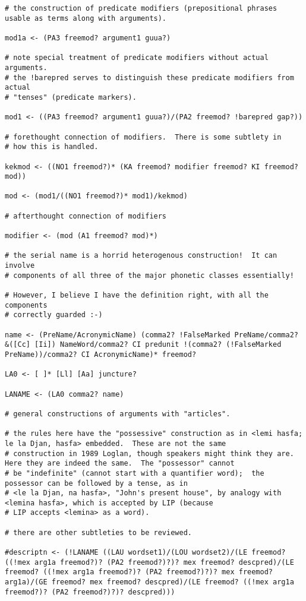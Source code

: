 \documentclass{article}
\begin{document}
\begin{verbatim}
# the construction of predicate modifiers (prepositional phrases usable as terms along with arguments).

mod1a <- (PA3 freemod? argument1 guua?)

# note special treatment of predicate modifiers without actual arguments.
# the !barepred serves to distinguish these predicate modifiers from actual
# "tenses" (predicate markers).

mod1 <- ((PA3 freemod? argument1 guua?)/(PA2 freemod? !barepred gap?))

# forethought connection of modifiers.  There is some subtlety in
# how this is handled.

kekmod <- ((NO1 freemod?)* (KA freemod? modifier freemod? KI freemod? mod))

mod <- (mod1/((NO1 freemod?)* mod1)/kekmod)

# afterthought connection of modifiers

modifier <- (mod (A1 freemod? mod)*)

# the serial name is a horrid heterogenous construction!  It can involve
# components of all three of the major phonetic classes essentially!

# However, I believe I have the definition right, with all the components
# correctly guarded :-)

name <- (PreName/AcronymicName) (comma2? !FalseMarked PreName/comma2? &([Cc] [Ii]) NameWord/comma2? CI predunit !(comma2? (!FalseMarked PreName))/comma2? CI AcronymicName)* freemod? 

LA0 <- [ ]* [Ll] [Aa] juncture?  

LANAME <- (LA0 comma2? name)

# general constructions of arguments with "articles".

# the rules here have the "possessive" construction as in <lemi hasfa; le la Djan, hasfa> embedded.  These are not the same
# construction in 1989 Loglan, though speakers might think they are.  Here they are indeed the same.  The "possessor" cannot
# be "indefinite" (cannot start with a quantifier word);  the possessor can be followed by a tense, as in 
# <le la Djan, na hasfa>, "John's present house", by analogy with <lemina hasfa>, which is accepted by LIP (because
# LIP accepts <lemina> as a word).

# there are other subtleties to be reviewed.

#descriptn <- (!LANAME ((LAU wordset1)/(LOU wordset2)/(LE freemod? ((!mex arg1a freemod?)? (PA2 freemod?)?)? mex freemod? descpred)/(LE freemod? ((!mex arg1a freemod?)? (PA2 freemod?)?)? mex freemod? arg1a)/(GE freemod? mex freemod? descpred)/(LE freemod? ((!mex arg1a freemod?)? (PA2 freemod?)?)? descpred)))


\end{verbatim}
\end{document}
